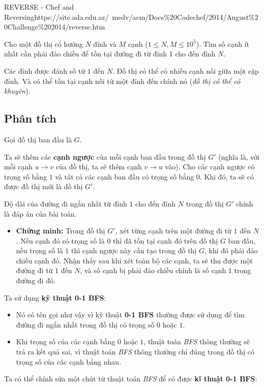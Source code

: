 \begin{baitap}{REVERSE - Chef and Reversing}{https://site.ada.edu.az/~medv/acm/Docs\%20Codechef/2014/August\%20Challenge\%202014/reverse.htm}

Cho một đồ thị có hướng $N$ đỉnh và $M$ cạnh ($1 \leq N, M \leq 10^5$). Tìm số cạnh ít nhất cần phải đảo chiều để tồn tại đường đi từ đỉnh 1 cho đến đỉnh $N$.

Các đỉnh được đánh số từ $1$ đến $N$. Đồ thị có thể có nhiều cạnh nối giữa một cặp đỉnh. Và có thể tồn tại cạnh nối từ một đỉnh đến chính nó (\textit{đồ thị có thể có khuyên}).

\subsection{Phân tích}

Gọi đồ thị ban đầu là $G$.

Ta sẽ thêm các \textbf{cạnh ngược} của mỗi cạnh ban đầu trong đồ thị $G'$ (nghĩa là, với mỗi cạnh $u \to v$ của đồ thị, ta sẽ thêm cạnh $v \to u$ vào).  
Cho các cạnh ngược có trọng số bằng $1$ và tất cả các cạnh ban đầu có trọng số bằng $0$. Khi đó, ta sẽ có được đồ thị mới là đồ thị $G'$.

Độ dài của đường đi ngắn nhất từ đỉnh $1$ cho đến đỉnh $N$ trong đồ thị $G'$ chính là đáp án của bài toán.

\begin{itemize}
    \item \textbf{Chứng minh:} Trong đồ thị $G'$, xét từng cạnh trên một đường đi từ $1$ đến $N$. Nếu cạnh đó có trọng số là $0$ thì đã tồn tại cạnh đó trên đồ thị $G$ ban đầu, nếu trọng số là $1$ thì cạnh ngược này cần tạo trong đồ thị $G$, khi đó phải đảo chiều cạnh đó. Nhận thấy sau khi xét toàn bộ các cạnh, ta sẽ thu được một đường đi từ $1$ đến $N$, và số cạnh bị phải đảo chiều chính là số cạnh $1$ trong đường đi đó.
\end{itemize}

Ta sử dụng \textbf{kỹ thuật 0-1 BFS}:

\begin{itemize}
    \item Nó có tên gọi như vậy vì kỹ thuật \textbf{0-1 BFS} thường được sử dụng để tìm đường đi ngắn nhất trong đồ thị có trọng số $0$ hoặc $1$.
    \item Khi trọng số của các cạnh bằng $0$ hoặc $1$, thuật toán \textit{BFS} thông thường sẽ trả ra kết quả sai, vì thuật toán \textit{BFS} thông thường chỉ đúng trong đồ thị có trọng số của các cạnh bằng nhau.
\end{itemize}
Ta có thể chỉnh sửa một chút từ thuật toán \textit{BFS} để có được \textbf{kĩ thuật 0-1 BFS}:


\end{baitap}
